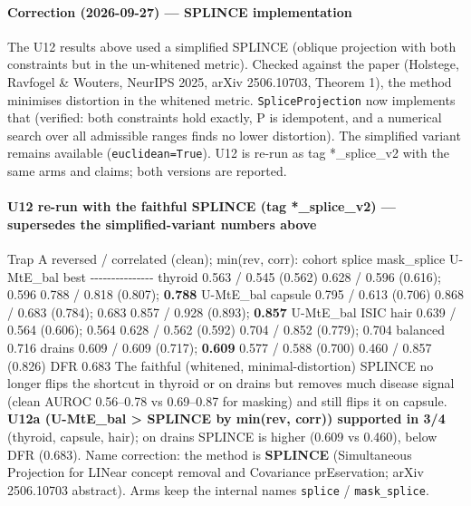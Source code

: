 {\paragraph{Correction (2026-09-27) --- SPLINCE implementation}\label{correction-2026-09-27--splince-implementation}

The U12 results above used a simplified SPLINCE (oblique projection with both constraints but in the un-whitened
metric). Checked against the paper (Holstege, Ravfogel \& Wouters, NeurIPS 2025, arXiv 2506.10703, Theorem 1), the
method minimises distortion in the whitened metric. \texttt{SpliceProjection} now implements that (verified: both
constraints hold exactly, P is idempotent, and a numerical search over all admissible ranges finds no lower
distortion). The simplified variant remains available (\texttt{euclidean=True}). U12 is re-run as tag *\_splice\_v2 with the
same arms and claims; both versions are reported.

\paragraph{U12 re-run with the faithful SPLINCE (tag *\_splice\_v2) --- supersedes the simplified-variant numbers above}\label{u12-re-run-with-the-faithful-splince-tag-_splice_v2--supersedes-the-simplified-variant-numbers-above}

Trap A reversed / correlated (clean); min(rev, corr):
\textbar{} cohort \textbar{} splice \textbar{} mask\_splice \textbar{} U-MtE\_bal \textbar{} best \textbar{}
\textbar-\/-\/-\textbar-\/-\/-\textbar-\/-\/-\textbar-\/-\/-\textbar-\/-\/-\textbar{}
\textbar{} thyroid \textbar{} 0.563 / 0.545 (0.562) \textbar{} 0.628 / 0.596 (0.616); 0.596 \textbar{} 0.788 / 0.818 (0.807); \textbf{0.788} \textbar{} U-MtE\_bal \textbar{}
\textbar{} capsule \textbar{} 0.795 / 0.613 (0.706) \textbar{} 0.868 / 0.683 (0.784); 0.683 \textbar{} 0.857 / 0.928 (0.893); \textbf{0.857} \textbar{} U-MtE\_bal \textbar{}
\textbar{} ISIC hair \textbar{} 0.639 / 0.564 (0.606); 0.564 \textbar{} 0.628 / 0.562 (0.592) \textbar{} 0.704 / 0.852 (0.779); 0.704 \textbar{} balanced 0.716 \textbar{}
\textbar{} drains \textbar{} 0.609 / 0.609 (0.717); \textbf{0.609} \textbar{} 0.577 / 0.588 (0.700) \textbar{} 0.460 / 0.857 (0.826) \textbar{} DFR 0.683 \textbar{}
The faithful (whitened, minimal-distortion) SPLINCE no longer flips the shortcut in thyroid or on drains but removes much
disease signal (clean AUROC 0.56--0.78 vs 0.69--0.87 for masking) and still flips it on capsule. \textbf{U12a (U-MtE\_bal \textgreater{}
SPLINCE by min(rev, corr)) supported in 3/4} (thyroid, capsule, hair); on drains SPLINCE is higher (0.609 vs 0.460),
below DFR (0.683).
Name correction: the method is \textbf{SPLINCE} (Simultaneous Projection for LINear concept removal and Covariance
prEservation; arXiv 2506.10703 abstract). Arms keep the internal names \texttt{splice} / \texttt{mask\_splice}.

}

